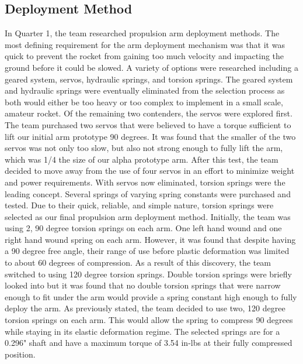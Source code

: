 \subsection{Deployment Method}
In Quarter 1, the team researched propulsion arm deployment methods. The most defining requirement for the arm deployment mechanism was that it was quick to prevent the rocket from gaining too much velocity and impacting the ground before it could be slowed. A variety of options were researched including a geared system, servos, hydraulic springs, and torsion springs. The geared system and hydraulic springs were eventually eliminated from the selection process as both would either be too heavy or too complex to implement in a small scale, amateur rocket. Of the remaining two contenders, the servos were explored first. The team purchased two servos that were believed to have a torque sufficient to lift our initial arm prototype 90 degrees. It was found that the smaller of the two servos was not only too slow, but also not strong enough to fully lift the arm, which was 1/4 the size of our alpha prototype arm. After this test, the team decided to move away from the use of four servos in an effort to minimize weight and power requirements. With servos now eliminated, torsion springs were the leading concept. Several springs of varying spring constants were purchased and tested. Due to their quick, reliable, and simple nature, torsion springs were selected as our final propulsion arm deployment method. Initially, the team was using 2, 90 degree torsion springs on each arm. One left hand wound and one right hand wound spring on each arm. However, it was found that despite having a 90 degree free angle, their range of use before plastic deformation was limited to about 60 degrees of compression. As a result of this discovery, the team switched to using 120 degree torsion springs. Double torsion springs were briefly looked into but it was found that no double torsion springs that were narrow enough to fit under the arm would provide a spring constant high enough to fully deploy the arm. As previously stated, the team decided to use two, 120 degree torsion springs on each arm. This would allow the spring to compress 90 degrees while staying in its elastic deformation regime. The selected springs are for a 0.296" shaft and have a maximum torque of 3.54 in-lbs at their fully compressed position.


